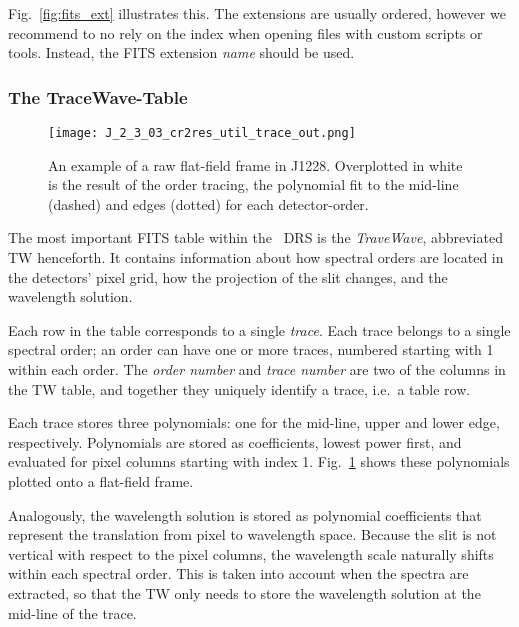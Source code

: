 Fig.~\ref{fig:fits_ext} illustrates this. The extensions are usually ordered,
however we recommend to no rely on the index when opening files with custom
scripts or tools. Instead, the FITS extension \emph{name} should be used.

\subsubsection{The TraceWave-Table}
\label{sec:tracewave}

\begin{figure}[!tb]
    \begin{center}
      \texttt{[image: J\_2\_3\_03\_cr2res\_util\_trace\_out.png]}
    \end{center}
    \caption{
      \label{fig:flat_trace}
      An example of a raw flat-field frame in J1228. Overplotted in white is 
      the result of the order tracing, the polynomial fit to the mid-line
      (dashed) and edges (dotted) for each detector-order.
      }
  \end{figure}

The most important FITS table within the \instrument\ DRS is the
\emph{TraveWave}, abbreviated TW henceforth. It contains information about how
spectral orders are located in the detectors' pixel grid, how the projection of
the slit changes, and the wavelength solution.

Each row in the table corresponds to a single \emph{trace}. Each trace belongs
to a single spectral order; an order can have one or more traces, numbered
starting with 1 within each order. The \emph{order number} and \emph{trace
number} are two of the columns in the TW table, and together they uniquely
identify a trace, i.e.~a table row.

Each trace stores three polynomials: one for the mid-line, upper and lower edge,
respectively. Polynomials are stored as coefficients, lowest power first, and
evaluated for pixel columns starting with index 1. Fig.~\ref{fig:flat_trace}
shows these polynomials plotted onto a flat-field frame.

Analogously, the wavelength solution is stored as polynomial coefficients
that represent the translation from pixel to wavelength space. Because the slit
is not vertical with respect to the pixel columns, the wavelength scale
naturally shifts within each spectral order. This is taken into account when the
spectra are extracted, so that the TW only needs to store the wavelength
solution at the mid-line of the trace.

